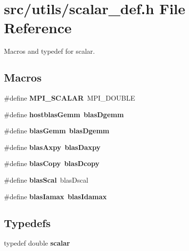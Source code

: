 \section{src/utils/scalar\-\_\-def.h File Reference}
\label{scalar__def_8h}


Macros and typedef for scalar.  


\subsection*{Macros}
\begin{DoxyCompactItemize}
\item 
\#define {\bfseries M\-P\-I\-\_\-\-S\-C\-A\-L\-A\-R}~M\-P\-I\-\_\-\-D\-O\-U\-B\-L\-E\label{scalar__def_8h_aa306e8aa5704dc3f0d00c75b4d57ece0}

\item 
\#define {\bfseries hostblas\-Gemm}~{\bf blas\-Dgemm}\label{scalar__def_8h_a02632beee9d090b1b0be013b14070835}

\item 
\#define {\bfseries blas\-Gemm}~{\bf blas\-Dgemm}\label{scalar__def_8h_ac0eee796785309391aedc816c14bc46f}

\item 
\#define {\bfseries blas\-Axpy}~{\bf blas\-Daxpy}\label{scalar__def_8h_a3dfa889e1d74262be04f23cc3980dbd5}

\item 
\#define {\bfseries blas\-Copy}~{\bf blas\-Dcopy}\label{scalar__def_8h_a5a3a483483cc594dedd7213d17d67571}

\item 
\#define {\bfseries blas\-Scal}~blas\-Dscal\label{scalar__def_8h_a19f7c510143eb574902a08d1fe960c5e}

\item 
\#define {\bfseries blas\-Iamax}~{\bf blas\-Idamax}\label{scalar__def_8h_ad91848271fa2d752779c6cece97d7662}

\end{DoxyCompactItemize}
\subsection*{Typedefs}
\begin{DoxyCompactItemize}
\item 
typedef double {\bfseries scalar}\label{scalar__def_8h_a3728ea48ebaf4a7e5def2384a2d603e9}

\end{DoxyCompactItemize}



